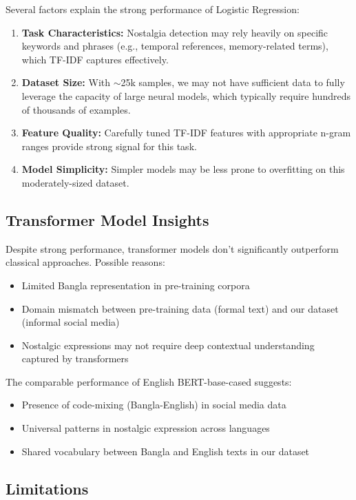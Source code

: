 \documentclass[conference]{IEEEtran}
\begin{document}
Several factors explain the strong performance of Logistic Regression:
\begin{enumerate}
\item \textbf{Task Characteristics:} Nostalgia detection may rely heavily on specific keywords and phrases (e.g., temporal references, memory-related terms), which TF-IDF captures effectively.
\item \textbf{Dataset Size:} With $\sim$25k samples, we may not have sufficient data to fully leverage the capacity of large neural models, which typically require hundreds of thousands of examples.
\item \textbf{Feature Quality:} Carefully tuned TF-IDF features with appropriate n-gram ranges provide strong signal for this task.
\item \textbf{Model Simplicity:} Simpler models may be less prone to overfitting on this moderately-sized dataset.
\end{enumerate}

\subsection{Transformer Model Insights}

Despite strong performance, transformer models don't significantly outperform classical approaches. Possible reasons:
\begin{itemize}
\item Limited Bangla representation in pre-training corpora
\item Domain mismatch between pre-training data (formal text) and our dataset (informal social media)
\item Nostalgic expressions may not require deep contextual understanding captured by transformers
\end{itemize}

The comparable performance of English BERT-base-cased suggests:
\begin{itemize}
\item Presence of code-mixing (Bangla-English) in social media data
\item Universal patterns in nostalgic expression across languages
\item Shared vocabulary between Bangla and English texts in our dataset
\end{itemize}

\subsection{Limitations}
\end{document}
